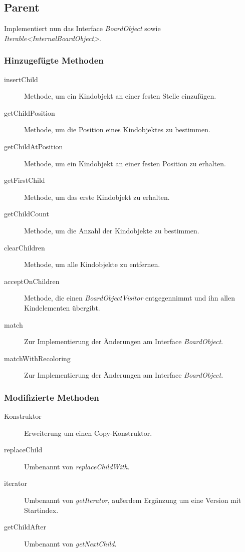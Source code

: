 \subsection{Parent}
Implementiert nun das Interface \emph{BoardObject} sowie \emph{Iterable<InternalBoardObject>}.

\subsubsection{Hinzugefügte Methoden}
\begin{description}
\item[insertChild]
Methode, um ein Kindobjekt an einer festen Stelle einzufügen.
\item[getChildPosition]
Methode, um die Position eines Kindobjektes zu bestimmen.
\item[getChildAtPosition]
Methode, um ein Kindobjekt an einer festen Position zu erhalten.
\item[getFirstChild]
Methode, um das erste Kindobjekt zu erhalten.
\item[getChildCount]
Methode, um die Anzahl der Kindobjekte zu bestimmen.
\item[clearChildren]
Methode, um alle Kindobjekte zu entfernen.
\item[acceptOnChildren]
Methode, die einen \emph{BoardObjectVisitor} entgegennimmt und ihn allen Kindelementen übergibt.
\item[match]
Zur Implementierung der Änderungen am Interface \emph{BoardObject}.
\item[matchWithRecoloring]
Zur Implementierung der Änderungen am Interface \emph{BoardObject}.
\end{description}

\subsubsection{Modifizierte Methoden}
\begin{description}
\item[Konstruktor]
Erweiterung um einen Copy-Konstruktor.
\item[replaceChild]
Umbenannt von \emph{replaceChildWith}.
\item[iterator]
Umbenannt von \emph{getIterator}, außerdem Ergänzung um eine Version mit Startindex.
\item[getChildAfter]
Umbenannt von \emph{getNextChild}.
\end{description}
